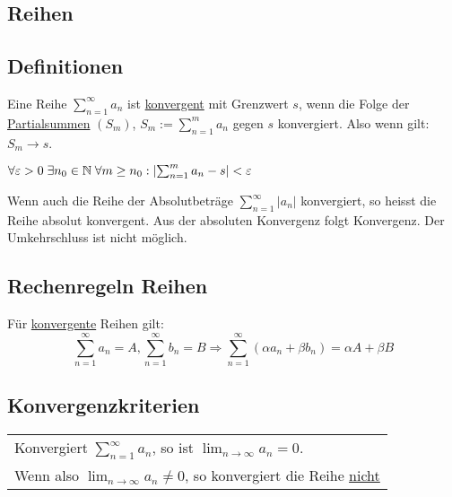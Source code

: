 \begin{multicols}{2}

\section{Reihen}

\subsection{Definitionen}
Eine Reihe $\sum_{n = 1}^\infty a_n$ ist \underline{konvergent} mit Grenzwert
$s$, wenn die Folge der \underline{Partialsummen} $(S_m)$, $S_m :=
\sum_{n=1}^m a_n$ gegen $s$ konvergiert. Also wenn gilt: $S_m \to s$.

\begin{definition}
	$\forall \varepsilon > 0 \; \exists n_0 \in \mathbb{N} \; \forall m \geq n_0: \left|
	\sum_{n=1}^m a_n - s \right| < \varepsilon$
\end{definition}

\begin{definition}
Wenn auch die Reihe der Absolutbeträge $\sum_{n=1}^\infty |a_n|$ konvergiert, so
heisst die Reihe absolut konvergent. Aus der absoluten Konvergenz folgt
Konvergenz. Der Umkehrschluss ist nicht möglich.
\end{definition}

\subsection{Rechenregeln Reihen}
Für \underline{konvergente} Reihen gilt:
\[
	\sum_{n=1}^\infty a_n = A, \sum_{n=1}^\infty b_n = B \Rightarrow
	\sum_{n=1}^\infty (\alpha a_n + \beta b_n) = \alpha A + \beta B
\]

\subsection{Konvergenzkriterien}
\begin{tabular}{|l|}
\hline
	Konvergiert $\sum_{n=1}^\infty a_n$, so ist $\lim_{n \to \infty} a_n = 0$.\\
	Wenn also $\lim_{n \to \infty} a_n \neq 0$, so konvergiert die Reihe
	\underline{nicht}\\
\hline
\end{tabular}

\end{multicols}

